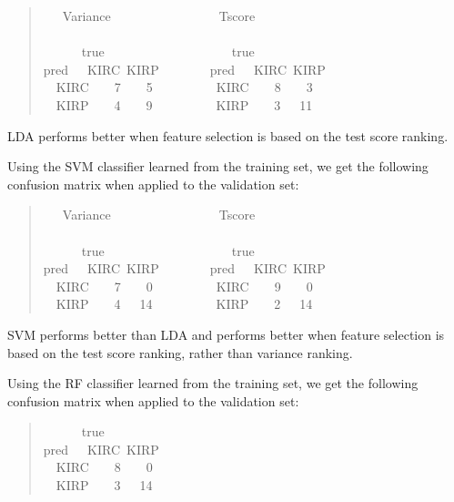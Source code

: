 \begin{quote}{  \ttfamily \raggedright \noindent
\centering
~~~Variance~~~~~~~~~~~~~~~~~Tscore\\
~\\
~~~~~~true~~~~~~~~~~~~~~~~~~~~true\\
pred~~~KIRC~KIRP~~~~~~~~pred~~~KIRC~KIRP\\
~~KIRC~~~~7~~~~5~~~~~~~~~~KIRC~~~~8~~~~3\\
~~KIRP~~~~4~~~~9~~~~~~~~~~KIRP~~~~3~~~11\\
}
\end{quote}

LDA performs better when feature selection is based on the test score ranking.

Using the SVM classifier learned from the training set, we get the following
confusion matrix when applied to the validation set:

\begin{quote}{ \ttfamily \raggedright \noindent
\centering
~~~Variance~~~~~~~~~~~~~~~~~Tscore\\
~\\
~~~~~~true~~~~~~~~~~~~~~~~~~~~true\\
pred~~~KIRC~KIRP~~~~~~~~pred~~~KIRC~KIRP\\
~~KIRC~~~~7~~~~0~~~~~~~~~~KIRC~~~~9~~~~0\\
~~KIRP~~~~4~~~14~~~~~~~~~~KIRP~~~~2~~~14\\
}
\end{quote}

SVM performs better than LDA and performs better when feature selection is
based on the test score ranking, rather than variance ranking.

Using the RF classifier learned from the training set, we get the following
confusion matrix when applied to the validation set:

\begin{quote}{ \ttfamily \raggedright \noindent
\centering
~~~~~~true\\
pred~~~KIRC~KIRP\\
~~KIRC~~~~8~~~~0\\
~~KIRP~~~~3~~~14\\
}
\end{quote}

